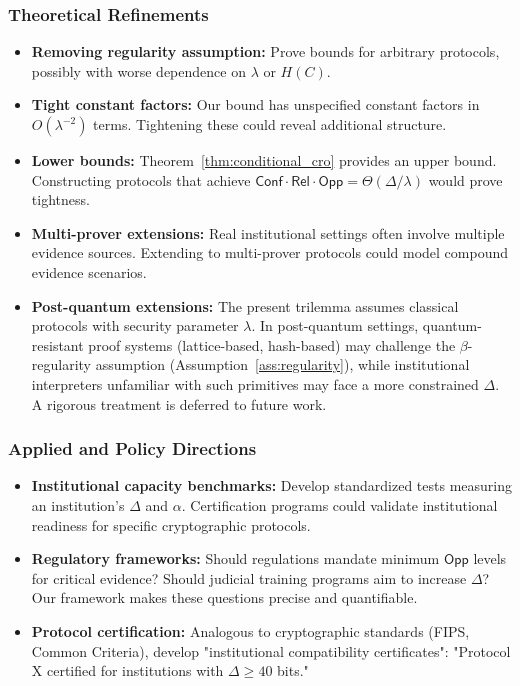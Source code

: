 \documentclass{ieeeaccess}
\newcommand{\Conf}{\mathsf{Conf}}
\newcommand{\Rel}{\mathsf{Rel}}
\newcommand{\Opp}{\mathsf{Opp}}
\begin{document}
\subsubsection{Theoretical Refinements}

\begin{itemize}
\item \textbf{Removing regularity assumption:} Prove bounds for arbitrary protocols, possibly with worse dependence on $\lambda$ or $H(C)$.

\item \textbf{Tight constant factors:} Our bound has unspecified constant factors in $O(\lambda^{-2})$ terms. Tightening these could reveal additional structure.

\item \textbf{Lower bounds:} Theorem~\ref{thm:conditional_cro} provides an upper bound. Constructing protocols that achieve $\Conf \cdot \Rel \cdot \Opp = \Theta(\Delta/\lambda)$ would prove tightness.

\item \textbf{Multi-prover extensions:} Real institutional settings often involve multiple evidence sources. Extending to multi-prover protocols could model compound evidence scenarios.
\item \textbf{Post-quantum extensions:} The present trilemma assumes classical protocols with security parameter $\lambda$. In post-quantum settings, quantum-resistant proof systems (lattice-based, hash-based) may challenge the $\beta$-regularity assumption 
(Assumption~\ref{ass:regularity}), while institutional interpreters unfamiliar with such 
primitives may face a more constrained $\Delta$. A rigorous treatment is deferred to future work.
\end{itemize}

\subsubsection{Applied and Policy Directions}

\begin{itemize}
\item \textbf{Institutional capacity benchmarks:} Develop standardized tests measuring an institution's $\Delta$ and $\alpha$. Certification programs could validate institutional readiness for specific cryptographic protocols.

\item \textbf{Regulatory frameworks:} Should regulations mandate minimum $\Opp$ levels for critical evidence? Should judicial training programs aim to increase $\Delta$? Our framework makes these questions precise and quantifiable.

\item \textbf{Protocol certification:} Analogous to cryptographic standards (FIPS, Common Criteria), develop "institutional compatibility certificates": "Protocol X certified for institutions with $\Delta \geq 40$ bits."
\end{itemize}
\end{document}
